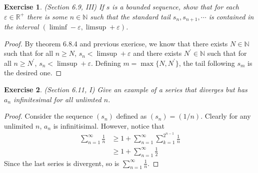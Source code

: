 \documentclass[a4paper, 11pt]{book}
\theoremstyle{plain}
\newtheorem{exercise}{Exercise}[chapter]
\theoremstyle{plain}
\newcommand{\N}{\mathbb{N}}
\newcommand{\R}{\mathbb{R}}
\newcommand{\p}{\prime}
\newcommand{\ep}{\varepsilon}
\begin{document}
  \begin{exercise}
    (Section 6.9, III)
    If $s$ is a bounded sequence, show that for each $\ep \in \R^+$ there is some $n \in \N$ such that the standard tail $s_n, s_{n+1}, \cdots$ is contained in the interval $(\liminf-\ep, \limsup+\ep)$.
  \end{exercise}
  \begin{proof}
    By theorem 6.8.4 and previous exericse, we know that there exists $N \in \N$ such that for all $n\geq N$, $s_n<\limsup+\ep$ and there exists $N^\p \in \N$ such that for all $n\geq N^\p$, $s_n<\limsup+\ep$. Defining $m=\max\{N, N^\p\}$, the tail following $s_m$ is the desired one.
  \end{proof}

  \begin{exercise}
    (Section 6.11, I)
    Give an example of a series that diverges but has $a_n$ infinitesimal for all unlimted $n$.
  \end{exercise}
  \begin{proof}
    Consider the sequence $(s_n)$ defined as $(s_n)=(1/n)$. Clearly for any unlimited $n$, $a_n$ is infinitisimal. However, notice that 
    \begin{align*}
      \sum_{n=1}^\infty \frac{1}{n} &\geq 1+\sum_{n=1}^\infty \sum_{k=1}^{2^{n-1}} \frac{1}{n} \\
      &\geq 1+\sum_{n=1}^\infty \frac{1}{2}
    \end{align*}
    Since the last series is divergent, so is $\sum_{n=1}^\infty \frac{1}{n}$.
  \end{proof}
\end{document}
